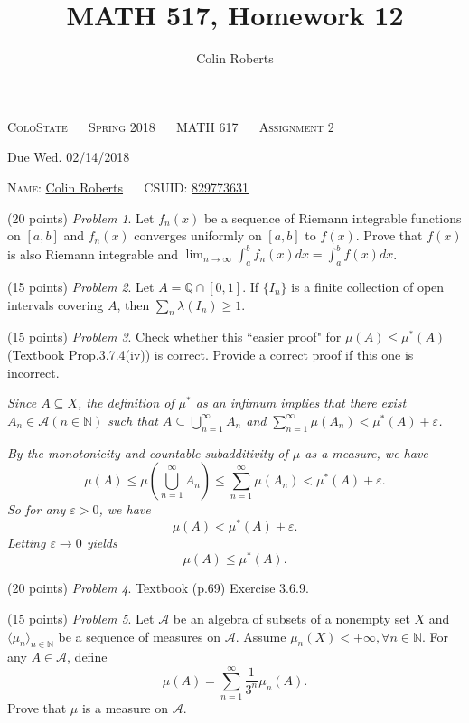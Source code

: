 \documentclass[leqno]{article}
\author{Colin Roberts}
\title{MATH 517, Homework 12}
\theoremstyle{nonumberplain}
\begin{document}
\begin{center}
  \textsc{\large ColoState ~~ Spring 2018 ~~ MATH 617 ~~ Assignment 2}
\end{center}

\begin{center}
  \textrm{Due Wed. 02/14/2018}
\end{center}

\vglue 0.10in

\bigskip
\noindent
\textsc{Name:} \underline{Colin Roberts\hglue 1.5in} ~~
\textsc{CSUID:} \underline{829773631\hglue 1.5in}

\vskip 0.15in

\bigskip
\noindent
(20 points) \textit{Problem 1}. \quad
Let $ f_n(x) $ be a sequence of Riemann integrable functions on $ [a,b] $
and $ f_n(x) $ converges uniformly on $ [a,b] $ to $ f(x) $.
Prove that $ f(x) $ is also Riemann integrable and
$ \displaystyle \lim_{n \to \infty} \int_a^b f_n(x)dx = \int_a^b f(x) dx $.

\bigskip
\bigskip
\noindent
(15 points) \textit{Problem 2}. \quad
Let $ A = \mathbb{Q} \cap [0,1] $.
If $ \{ I_n \} $ is a finite collection of open intervals covering $ A $,
then $ \sum_{n} \lambda(I_n) \geq 1 $.

\bigskip
\bigskip
\noindent
(15 points) \textit{Problem 3}. \quad
Check whether this ``easier proof" for $ \mu(A) \le \mu^*(A) $
(Textbook Prop.3.7.4(iv)) is correct.
Provide a correct proof if this one is incorrect.

\smallskip
\textit{
Since $ A \subseteq X $,
the definition of $ \mu^* $ as an infimum implies that
there exist $ A_n \in \mathcal{A} (n \in \mathbb{N}) $
such that $ A \subseteq \bigcup_{n=1}^\infty A_n $
and $ \sum_{n=1}^\infty \mu(A_n) < \mu^*(A) + \varepsilon $.}

\textit{
By the monotonicity and countable subadditivity of $ \mu $ as a measure,
we have
$$
  \mu(A) \le \mu(\bigcup_{n=1}^\infty A_n)
  \le \sum_{n=1}^\infty \mu(A_n)
  < \mu^*(A) + \varepsilon.
$$
So for any $ \varepsilon>0 $, we have
$$
  \mu(A) < \mu^*(A) + \varepsilon.
$$
Letting $ \varepsilon \to 0 $ yields
$$
  \mu(A) \le \mu^*(A).
$$
}

\bigskip
\bigskip
\noindent
(20 points) \textit{Problem 4}. \quad
Textbook (p.69) Exercise 3.6.9.

\bigskip
\bigskip
\noindent
(15 points) \textit{Problem 5}. \quad
Let $ \mathcal{A} $ be an algebra of subsets of a nonempty set $ X $
and $ \langle \mu_n \rangle_{n \in \mathbb{N}} $
be a sequence of measures on $ \mathcal{A} $.
Assume $ \mu_n(X)<+\infty, \forall n \in \mathbb{N} $.
For any $ A \in \mathcal{A} $, define
$$
  \mu(A) = \sum_{n=1}^\infty \frac{1}{3^n} \mu_n(A).
$$
Prove that $ \mu $ is a measure on $ \mathcal{A} $.
\end{document}
